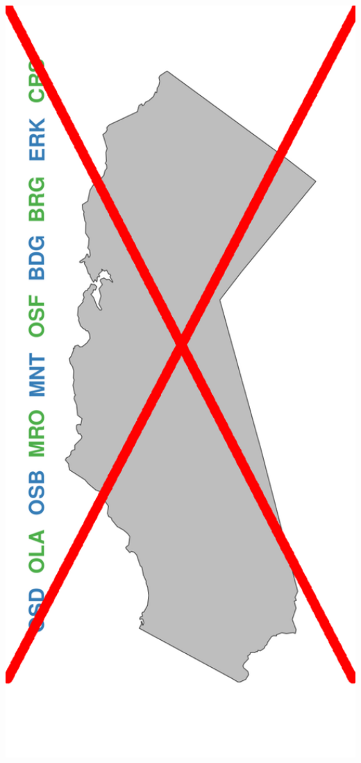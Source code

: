 \documentclass[ xcolor = pdftex, dvipsnames, table ]{beamer}
\begin{document}
\begin{frame}
{\begin{minipage}[h!]{0.19\textwidth}
\end{minipage}
\begin{minipage}[h!]{0.19\textwidth}
        \hspace*{0.25cm}
        \includegraphics[width=1.2\textwidth]{../pictures/mapFullEveryOtherNot.pdf}

\end{minipage}}
\end{frame}
\end{document}
